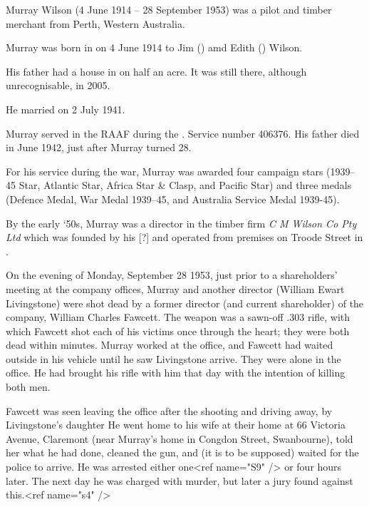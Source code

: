 
Murray Wilson (4 June 1914 -- 28 September 1953) was a pilot and timber merchant from Perth, Western Australia.

Murray was born in \cite{WABMD208} on 4 June 1914 to Jim () amd Edith () Wilson.

His father had a house in  on half an acre.  It was still there, although unrecognisable, in 2005.

He married  on 2 July 1941.\cite{MurrayMargMarriageNotice}

Murray served in the RAAF during the . Service number 406376.\cite{NAAA9300} His father died in June 1942, just after Murray turned 28.

For his service during the war, Murray was awarded\cite{RMWDeptAirLetter} four campaign stars (1939--45 Star, Atlantic Star, Africa Star \& Clasp, and Pacific Star) and three medals (Defence Medal, War Medal 1939--45, and Australia Service Medal 1939-45).


By the early `50s, Murray was a director in the timber firm \emph{C M Wilson Co Pty Ltd} which was founded by his [?] and operated from premises on Troode Street in .\cite{CompanyChiefs}

On the evening of Monday, September 28 1953,\cite{WADeaths, WestAusDeathNotices, VictimEstate} just prior to a shareholders' meeting at the company offices, Murray and another director (William Ewart Livingstone) were shot dead by a former director\cite{InsanityVerdict} (and current shareholder) of the company, William Charles Fawcett.  The weapon was a sawn-off .303 rifle,\cite{GuiltyInsane, CompanyChiefs, TimberDirectors} with which Fawcett shot each of his victims once through the heart; they were both dead within minutes.\cite{CompanyChiefs}  Murray worked at the office, and Fawcett had waited outside in his vehicle until he saw Livingstone arrive.\cite{MurderDirectors} They were alone in the office.\cite{NewAngle} He had brought his rifle with him that day with the intention of killing both men.\cite{DoubleMurder}

Fawcett was seen leaving the office after the shooting and driving away, by Livingstone's daughter\cite{FawcettRemanded} He went home to his wife at their home at 66 Victoria Avenue, Claremont (near Murray's home in Congdon Street, Swanbourne)\cite{FawcettRemanded}, told her what he had done, cleaned the gun, and (it is to be supposed) waited for the police to arrive.\cite{DoubleMurder}  He was arrested either one<ref name="S9" /> or four\cite{SMHDoubleMurder} hours later.  The next day he was charged with murder,\cite{SMHDoubleMurder} but later a jury found against this.<ref name="s4" />

